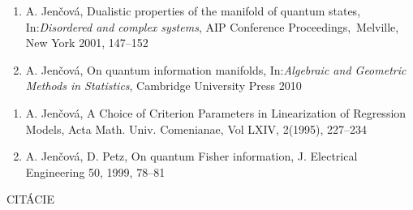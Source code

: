 \documentclass[A4paper]{article}
\begin{document}
\begin{enumerate}
\setcounter{enumi}{\value{foo}}

\item \label{dualistic} A. Jen\v cov\' a, Dualistic properties of the manifold of quantum
states,\\ In:{\it Disordered and complex systems},
AIP Conference Proceedings,\ Melville, New York 2001,
147--152

\item \label{yasp2} A. Jen\v cov\'a, On quantum information manifolds, In:{\it Algebraic and Geometric Methods in Statistics}, Cambridge University Press 2010
\setcounter{foo}{\value{enumi}}

\end{enumerate}

\begin{enumerate}
\setcounter{enumi}{\value{foo}}

\item \label{lin_achoice} A. Jen\v cov\'a,  A Choice of Criterion Parameters in
Linearization of Regression Models, Acta Math. Univ.
Comenianae, Vol LXIV, 2(1995), 227--234

\item \label{fisher} A. Jen\v cov\'a, D. Petz, On quantum Fisher information, J.
Electrical Engineering 50, 1999, 78--81
\setcounter{foo}{\value{enumi}}

\end{enumerate}






\newpage
\begin{center} CIT\'ACIE \end{center}

\end{document}
